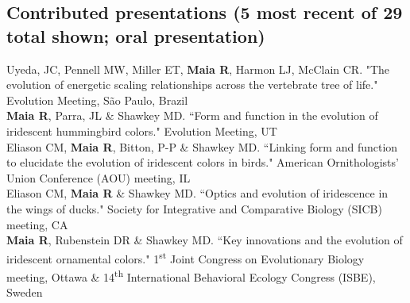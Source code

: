 \documentclass[10pt]{article}
\newcommand{\years}[1]{\marginnote{\raggedleft\scriptsize #1}}
\begin{document}
\subsection*{Contributed presentations (5 most recent of 29 total shown; \dag oral presentation)}

\years{2015} \dag Uyeda, JC, Pennell MW, Miller ET, \textbf{Maia R}, Harmon LJ, McClain CR. "The evolution of energetic scaling relationships across the vertebrate tree of life." Evolution Meeting, S\~ao Paulo, Brazil\\

\years{2013} \textbf{Maia R}, Parra, JL \& Shawkey MD. “Form and function in the evolution of iridescent hummingbird colors." Evolution Meeting, UT\\

\years{} \dag Eliason CM, \textbf{Maia R}, Bitton, P-P \& Shawkey MD. “Linking form and function to elucidate the evolution of iridescent colors in birds." American Ornithologists' Union Conference (\textsc{AOU}) meeting, IL\\

\years{} \dag Eliason CM, \textbf{Maia R} \& Shawkey MD. “Optics and evolution of iridescence in the wings of ducks." Society for Integrative and Comparative Biology (\textsc{SICB}) meeting, CA\\

\years{2012} \dag \textbf{Maia R}, Rubenstein DR \& Shawkey MD. “Key innovations and the evolution of iridescent ornamental colors." 1\textsuperscript{st} Joint Congress on Evolutionary Biology meeting, Ottawa \& 14\textsuperscript{th} International Behavioral Ecology Congress (\textsc{ISBE}), Sweden\\



\end{document}
